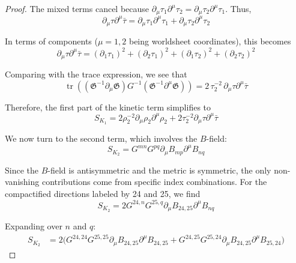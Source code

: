 \begin{tcolorbox}[breakable]
\begin{proof}
		The mixed terms cancel because \(\partial_\mu \tau_1 \partial^\mu \tau_2 = \partial_\mu \tau_2 \partial^\mu \tau_1\). Thus,
		\begin{equation}
			\partial_\mu \tau \partial^\mu \bar{\tau} = \partial_\mu \tau_1 \partial^\mu \tau_1 + \partial_\mu \tau_2 \partial^\mu \tau_2
		\end{equation}
		
		In terms of components (\(\mu = 1,2\) being worldsheet coordinates), this becomes
		\begin{equation}
			\partial_\mu \tau \partial^\mu \bar{\tau} = (\partial_1 \tau_1)^2 + (\partial_2 \tau_1)^2 + (\partial_1 \tau_2)^2 + (\partial_2 \tau_2)^2
		\end{equation}
		
		Comparing with the trace expression, we see that
		\begin{equation}
			\operatorname{tr}\left((\mathfrak{G}^{-1}\partial_\mu \mathfrak{G})G^{-1}(\mathfrak{G}^{-1}\partial^\mu \mathfrak{G})\right) 
			= 2\,\tau_2^{-2}\,\partial_\mu \tau \partial^\mu \bar{\tau}
		\end{equation}
		
		Therefore, the first part of the kinetic term simplifies to
		\begin{equation}
			S_{K_1} = 2 \rho_2^{-2} \partial_\mu \rho_2 \partial^\mu \rho_2 
			+ 2 \tau_2^{-2} \partial_\mu \tau \partial^\mu \bar{\tau}
		\end{equation}
		
		We now turn to the second term, which involves the \(B\)-field:
		\begin{equation}
			S_{K_2} = G^{mn} G^{pq} \partial_\mu B_{mp} \partial^\mu B_{nq}
		\end{equation}
		
		Since the \(B\)-field is antisymmetric and the metric is symmetric, the only non-vanishing contributions come from specific index combinations. For the compactified directions labeled by 24 and 25, we find
		\begin{equation}
			S_{K_2} = 2 G^{24,n} G^{25,q} \partial_\mu B_{24,25} \partial^\mu B_{nq}
		\end{equation}
		
		Expanding over \(n\) and \(q\):
		\begin{align}
			S_{K_2} &= 2 \bigl( G^{24,24} G^{25,25} \partial_\mu B_{24,25} \partial^\mu B_{24,25}  + G^{24,25} G^{25,24} \partial_\mu B_{24,25} \partial^\mu B_{25,24} \bigr)
		\end{align}
		

\end{proof}
\end{tcolorbox}
